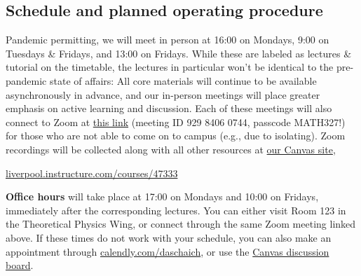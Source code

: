 \subsection*{Schedule and planned operating procedure}
Pandemic permitting, we will meet in person at 16:00 on Mondays, 9:00 on Tuesdays \& Fridays, and 13:00 on Fridays.
While these are labeled as lectures \& tutorial on the timetable, the lectures in particular won't be identical to the pre-pandemic state of affairs: All core materials will continue to be available asynchronously in advance, and our in-person meetings will place greater emphasis on active learning and discussion.
Each of these meetings will also connect to Zoom at \href{https://liverpool-ac-uk.zoom.us/j/92984060744?pwd=WkVPek8ySlVGVmZVQXJSL21HTTd2Zz09}{this link} (meeting ID 929 8406 0744, passcode MATH327!) for those who are not able to come on to campus (e.g., due to isolating).
Zoom recordings will be collected along with all other resources at \href{https://liverpool.instructure.com/courses/47333}{our Canvas site}, \\
\centerline{\href{https://liverpool.instructure.com/courses/47333}{liverpool.instructure.com/courses/47333}}

\textbf{Office hours} will take place at 17:00 on Mondays and 10:00 on Fridays, immediately after the corresponding lectures.
You can either visit Room 123 in the Theoretical Physics Wing, or connect through the same Zoom meeting linked above.
If these times do not work with your schedule, you can also make an appointment through \href{https://calendly.com/daschaich/meet}{calendly.com/daschaich}, or use the \href{https://liverpool.instructure.com/courses/47333/discussion_topics}{Canvas discussion board}.




